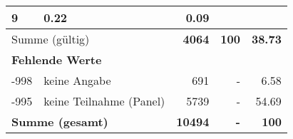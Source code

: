 \begin{longtable}{lXrrr}
       \num{9} &
       \num[round-mode=places,round-precision=2]{0.22} &
         \num[round-mode=places,round-precision=2]{0.09} \\
     \midrule
     \multicolumn{2}{l}{Summe (gültig)} &
       \textbf{\num{4064}} &
     \textbf{\num{100}} &
       \textbf{\num[round-mode=places,round-precision=2]{38.73}} \\
     \multicolumn{5}{l}{\textbf{Fehlende Werte}}\\
       -998 &
       keine Angabe &
         \num{691} &
        - &
         \num[round-mode=places,round-precision=2]{6.58} \\
       -995 &
       keine Teilnahme (Panel) &
         \num{5739} &
        - &
         \num[round-mode=places,round-precision=2]{54.69} \\
     \midrule
     \multicolumn{2}{l}{\textbf{Summe (gesamt)}} &
          \textbf{\num{10494}} &
        \textbf{-} &
        \textbf{\num{100}} \\
     \bottomrule
     \end{longtable}
     
